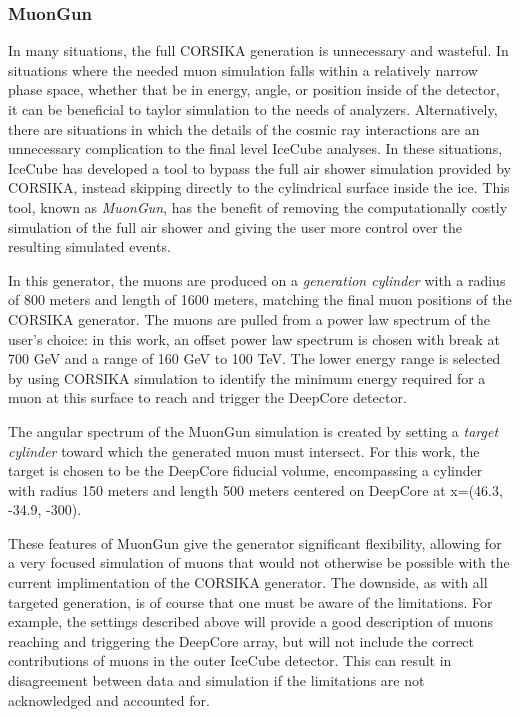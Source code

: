 \subsubsection{MuonGun}
In many situations, the full CORSIKA generation is unnecessary and wasteful. 
In situations where the needed muon simulation falls within a relatively narrow phase space, whether that be in energy, angle, or position inside of the detector, it can be beneficial to taylor simulation to the needs of analyzers.
Alternatively, there are situations in which the details of the cosmic ray interactions are an unnecessary complication to the final level IceCube analyses.
In these situations, IceCube has developed a tool to bypass the full air shower simulation provided by CORSIKA, instead skipping directly to the cylindrical surface inside the ice.
This tool, known as \emph{MuonGun}, has the benefit of removing the computationally costly simulation of the full air shower and giving the user more control over the resulting simulated events.

In this generator, the muons are produced on a \emph{generation cylinder} with a radius of 800 meters and length of 1600 meters, matching the final muon positions of the CORSIKA generator.
The muons are pulled from a power law spectrum of the user's choice: in this work, an offset power law spectrum is chosen with break at 700 GeV and a range of 160 GeV to 100 TeV.
The lower energy range is selected by using CORSIKA simulation to identify the minimum energy required for a muon at this surface to reach and trigger the DeepCore detector.

The angular spectrum of the MuonGun simulation is created by setting a \emph{target cylinder} toward which the generated muon must intersect.
For this work, the target is chosen to be the DeepCore fiducial volume, encompassing a cylinder with radius 150 meters and length 500 meters centered on DeepCore at x=(46.3, -34.9, -300). 

These features of MuonGun give the generator significant flexibility, allowing for a very focused simulation of muons that would not otherwise be possible with the current implimentation of the CORSIKA generator.
The downside, as with all targeted generation, is of course that one must be aware of the limitations. 
For example, the settings described above will provide a good description of muons reaching and triggering the DeepCore array, but will not include the correct contributions of muons in the outer IceCube detector.
This can result in disagreement between data and simulation if the limitations are not acknowledged and accounted for.

